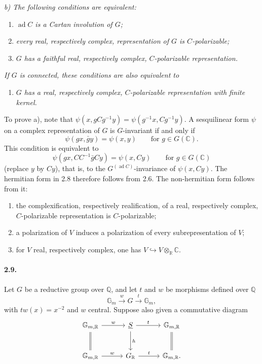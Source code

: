 \documentclass[10pt]{article}
\newcommand{\C}{\mathbb{C}}
\newcommand{\Q}{\mathbb{Q}}
\newcommand{\R}{\mathbb{R}}
\newcommand{\Gm}{\mathbb{G}_m}
\newcommand{\ad}{\operatorname{ad}}
\newcommand{\into}{\hookrightarrow}
\begin{document}
\emph{b) The following conditions are equivalent:}
\begin{enumerate}[label=(\roman*)]
\item \emph{$\ad C$ is a Cartan involution of $G$;}
\item \emph{every real, respectively complex, representation of $G$ is $C$-polarizable;}
\item \emph{$G$ has a faithful real, respectively complex, $C$-polarizable representation.}
\end{enumerate}
\emph{If $G$ is connected, these conditions are also equivalent to}
\begin{enumerate}[label=(iii\textquotesingle)]
\item \emph{$G$ has a real, respectively complex, $C$-polarizable representation with finite kernel.}
\end{enumerate}

To prove a), note that $\psi(x,gCg^{-1}y)=\psi(g^{-1}x,Cg^{-1}y)$. A sesquilinear form $\psi$ on a complex representation of $G$ is $G$-invariant if and only if
\[
\psi(gx,\bar g y)=\psi(x,y)\qquad\text{for }g\in G(\C).
\]
This condition is equivalent to
\[
\psi(gx,CC^{-1}\bar g Cy)=\psi(x,Cy)\qquad\text{for }g\in G(\C)
\]
(replace $y$ by $Cy$), that is, to the $G^{(\ad C)}$-invariance of $\psi(x,Cy)$. The hermitian form in 2.8 therefore follows from 2.6. The non-hermitian form follows from it:
\begin{enumerate}[label=\alph*)]
\item the complexification, respectively realification, of a real, respectively complex, $C$-polarizable representation is $C$-polarizable;
\item a polarization of $V$ induces a polarization of every subrepresentation of $V$;
\item for $V$ real, respectively complex, one has $V\into V\otimes_\R\C$.
\end{enumerate}

\paragraph{2.9.} Let $G$ be a reductive group over $\Q$, and let $t$ and $w$ be morphisms defined over $\Q$
\[
\Gm \xrightarrow{\ w\ } G \xrightarrow{\ t\ } \Gm,
\]
with $tw(x)=x^{-2}$ and $w$ central. Suppose also given a commutative diagram
\[
\begin{tikzcd}[column sep=3em,row sep=2.6em]
\mathbb G_{m,\R} \arrow[r,"w"] \arrow[d,equal] & \underline S \arrow[r,"t"] \arrow[d,"h"] & \mathbb G_{m,\R} \arrow[d,equal]\\
\mathbb G_{m,\R} \arrow[r,"w"] & G_\R \arrow[r,"t"] & \mathbb G_{m,\R}.
\end{tikzcd}
\]
\end{document}
